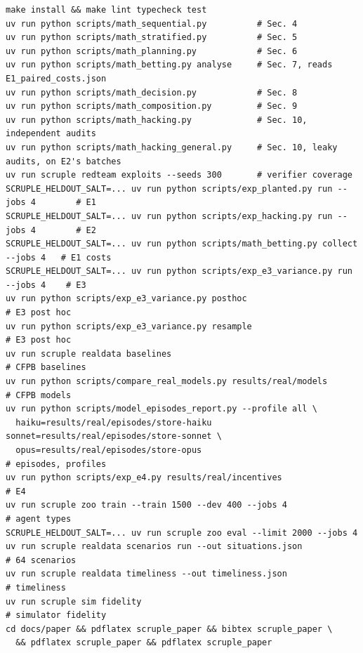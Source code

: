 \documentclass[11pt]{article}
\theoremstyle{definition}
\theoremstyle{remark}
\newcommand{\1}{\mathbf{1}}
\begin{document}
{\scriptsize
\begin{verbatim}
make install && make lint typecheck test
uv run python scripts/math_sequential.py          # Sec. 4
uv run python scripts/math_stratified.py          # Sec. 5
uv run python scripts/math_planning.py            # Sec. 6
uv run python scripts/math_betting.py analyse     # Sec. 7, reads E1_paired_costs.json
uv run python scripts/math_decision.py            # Sec. 8
uv run python scripts/math_composition.py         # Sec. 9
uv run python scripts/math_hacking.py             # Sec. 10, independent audits
uv run python scripts/math_hacking_general.py     # Sec. 10, leaky audits, on E2's batches
uv run scruple redteam exploits --seeds 300       # verifier coverage
SCRUPLE_HELDOUT_SALT=... uv run python scripts/exp_planted.py run --jobs 4        # E1
SCRUPLE_HELDOUT_SALT=... uv run python scripts/exp_hacking.py run --jobs 4        # E2
SCRUPLE_HELDOUT_SALT=... uv run python scripts/math_betting.py collect --jobs 4   # E1 costs
SCRUPLE_HELDOUT_SALT=... uv run python scripts/exp_e3_variance.py run --jobs 4    # E3
uv run python scripts/exp_e3_variance.py posthoc                                  # E3 post hoc
uv run python scripts/exp_e3_variance.py resample                                 # E3 post hoc
uv run scruple realdata baselines                                     # CFPB baselines
uv run python scripts/compare_real_models.py results/real/models      # CFPB models
uv run python scripts/model_episodes_report.py --profile all \
  haiku=results/real/episodes/store-haiku sonnet=results/real/episodes/store-sonnet \
  opus=results/real/episodes/store-opus                                # episodes, profiles
uv run python scripts/exp_e4.py results/real/incentives               # E4
uv run scruple zoo train --train 1500 --dev 400 --jobs 4              # agent types
SCRUPLE_HELDOUT_SALT=... uv run scruple zoo eval --limit 2000 --jobs 4
uv run scruple realdata scenarios run --out situations.json           # 64 scenarios
uv run scruple realdata timeliness --out timeliness.json              # timeliness
uv run scruple sim fidelity                                           # simulator fidelity
cd docs/paper && pdflatex scruple_paper && bibtex scruple_paper \
  && pdflatex scruple_paper && pdflatex scruple_paper
\end{verbatim}}
\end{document}
